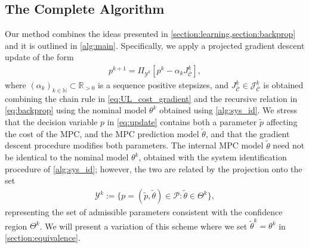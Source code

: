 \documentclass[journal,twoside,web,final]{ieeecolor}
\theoremstyle{definition}
\newcommand{\R}{\mathbb{R}}
\newcommand{\N}{\mathbb{N}}
\newcommand{\J}{\mathcal{J}}
\newcommand{\Cb}{{\bar{\mathcal{C}}}}
\newcommand{\rz}[1]{#1}
\begin{document}
\subsection{The Complete Algorithm}
\label{section:algorithm}
Our method combines the ideas presented in \cref{section:learning,section:backprop} and it is outlined in \cref{alg:main}. 
Specifically, we apply a projected gradient descent update of the form
\begin{align}
p^{k+1} = \Pi_{\mathcal{Y}^k}[p^k - \alpha_k J_\Cb^k], \label{eq:update}
\end{align}
where $(\alpha_k)_{k\in\N} \subset \R_{>0}$ is a sequence positive stepsizes, 
and $J_\Cb^k\in\J_\Cb^k$ is obtained combining the chain rule in \cref{eq:UL_cost_gradient} and the recursive relation in \cref{eq:backprop} using the nominal model $\theta^k$ obtained using \cref{alg:sys_id}. 
\rz{We stress that the decision variable $p$ in \cref{eq:update} contains both a parameter $\tilde{p}$ affecting the cost of the MPC, and the MPC prediction model $\tilde{\theta}$, and that the gradient descent procedure modifies both parameters. 
The internal MPC model $\tilde{\theta}$ need not be identical to the nominal model $\theta^k$, obtained with the system identification procedure of \cref{alg:sys_id}; 
however, the two are related by the projection onto the set}
\begin{align}
\mathcal{Y}^k:=\{ p = (\tilde{p},\tilde{\theta}) \in \mathcal{P}: \tilde{\theta}\in\Theta^k \},
\label{eq:constraint_set_yk}
\end{align}
representing the set of admissible parameters consistent with the confidence region $\Theta^k$. 
We will present a variation of this scheme where we set $\tilde{\theta}^k=\theta^k$ in \cref{section:equivalence}.
\end{document}
